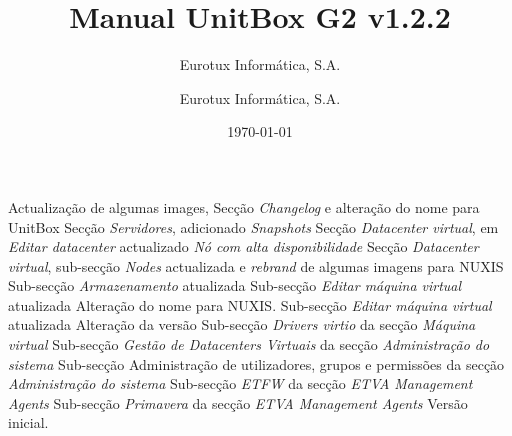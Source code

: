 \documentclass[12pt,a4paper,portuges]{scrreprt}
\author{Eurotux Informática, S.A.}
\title{Manual UnitBox G2 v1.2.2}
\subtitle{Eurotux Informática, S.A.}
\date{\today}
\begin{document}
\maketitle

\begin{Log}
Actualização de algumas images, Secção \textit{Changelog} e alteração do nome para UnitBox
Secção \textit{Servidores}, adicionado \textit{Snapshots}
Secção \textit{Datacenter virtual}, em \textit{Editar datacenter} actualizado \textit{Nó com alta disponibilidade }
Secção \textit{Datacenter virtual}, sub-secção \textit{Nodes} actualizada e \textit{rebrand} de algumas imagens para NUXIS
Sub-secção \textit{Armazenamento} atualizada
Sub-secção \textit{Editar máquina virtual} atualizada
Alteração do nome para NUXIS. Sub-secção \textit{Editar máquina virtual} atualizada
Alteração da versão
Sub-secção \textit{Drivers virtio} da secção \textit{Máquina virtual}
Sub-secção \textit{Gestão de Datacenters Virtuais} da secção \textit{Administração do sistema}
Sub-secção Administração de utilizadores, grupos e permissões da secção \textit{Administração do sistema}
Sub-secção \textit{ETFW} da secção \textit{ETVA Management Agents}
Sub-secção \textit{Primavera} da secção \textit{ETVA Management Agents}
Versão inicial.
\end{Log}

\tableofcontents

\listoffigures


%
%




\end{document}
